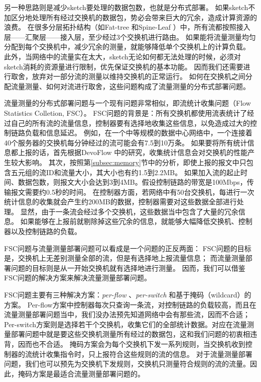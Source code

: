 另一种思路则是减少sketch要处理的数据包数，也就是分布式部署。
如果sketch不加区分地处理所有经过交换机的数据包，势必会带来巨大的冗余，造成计算资源的浪费。
在很多分层拓扑结构（如Fat-tree \cite{al2008scalable}和Spine-Leaf \cite{alizadeh2013data}）中，所有流都按照接入层——汇聚层——接入层，至少经过3个交换机进行路由。
如果能将流量测量均匀分配到每个交换机中，减少冗余的测量，就能够降低单个交换机上的计算负载。
此外，当网络中的流量实在太大，sketch无论如何都无法处理的时候，必须对sketch消耗的资源量进行限制，优先保证交换机的基本功能。
因而我们还需要进行取舍，放弃对一部分流的测量以维持交换机的正常运行。
如何在交换机之间分配流量测量、如何对流进行取舍，这些问题构成了流量测量的分布式部署问题。

流量测量的分布式部署问题与一个现有问题非常相似，即流统计收集问题（Flow Statistics Colletion, FSC）。
FSC问题的背景是：所有交换机都使用流表统计了经过自己的所有流的流量信息，控制器要有选择地收集这些信息，以免造成过大的控制链路负载和信息延迟。
例如，在一个中等规模的数据中心网络中\cite{kannan2013compact}，一个连接着40个服务器的交换机每分钟经过的流可能会有7.5到10万条。
如果要将所有统计信息都上报的话，首先根据DevoFlow \cite{curtis2011devoflow}中的研究，收集统计信息会对交换机的性能产生较大影响。
其次，按照第\ref{subsec:memory}节中的分析，即使上报的报文中只包含五元组的流ID和流量大小，其大小也有约1.5到2.2MB。
如果加入流的起止时间、数据包数，则报文大小会达到3到4MB。假设控制链路的带宽是100Mbps，传输报文需要约0.5秒的时间。
在控制器方面，若网络中有50台交换机，每进行一次统计信息的收集就会产生约200MB的数据，控制器需要对这些数据全部进行处理。
显然，由于一条流会经过多个交换机，这些数据当中包含了大量的冗余信息。
如果能够在上报前就剔除掉这些冗余的信息，就能够大幅降低交换机、控制器以及控制链路的负载。

FSC问题与流量测量部署问题可以看成是一个问题的正反两面：
FSC问题的目标是，交换机上无差别测量全部的流，但是有选择地上报流量信息；
而流量测量部署问题的目标则是从一开始交换机就有选择地进行测量。
因而，我们可以借鉴FSC问题的解决方案来解决流量测量部署问题。

FSC问题主要有三种解决方案：\emph{per-flow} \cite{van2014opennetmon}、\emph{per-switch} \cite{su2014flowcover}\cite{su2015cemon}和基于掩码（wildcard）的方案\cite{xu2017miniming}。
Per-flow方案中控制器每次只查询一条流，对控制链路的负载较高，而且在流量测量部署问题当中，我们没办法预先知道网络中会有那些流，因而不合适；
Per-switch方案则是选择若干个交换机，收集它们的全部统计数据。对应在流量测量部署问题中就是要这些交换机测量所有经过的数据包，这和我们问题的初衷相违背，因而也不合适。
掩码方案会为每个交换机下发一系列规则，当交换机收到控制器的流统计收集指令时，只上报符合这些规则的流的信息。
对于流量测量部署问题，我们也可以预先为交换机下发规则，交换机只测量符合规则的流的流量。因此，掩码方案是最适合流量测量部署问题的。


